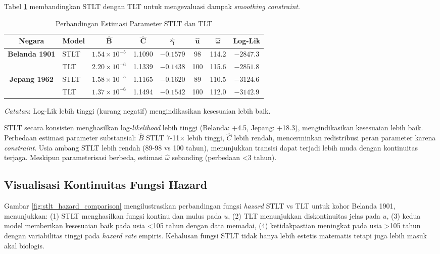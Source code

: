 Tabel \ref{tab:stlt_vs_tlt_comparison} membandingkan STLT dengan TLT untuk mengevaluasi dampak \textit{smoothing constraint}.

\begin{table}[H]
\centering
\caption{Perbandingan Estimasi Parameter STLT dan TLT}
\label{tab:stlt_vs_tlt_comparison}
\small
\begin{tabular}{clcccccc}
\hline
\textbf{Negara} & \textbf{Model} & $\boldsymbol{\hat{B}}$ & $\boldsymbol{\hat{C}}$ & $\boldsymbol{\hat{\gamma}}$ & $\boldsymbol{\hat{u}}$ & $\boldsymbol{\hat{\omega}}$ & \textbf{Log-Lik} \\
\hline
\multirow{2}{*}{\textbf{Belanda 1901}}
& STLT & $1.54 \times 10^{-5}$ & 1.1090 & $-0.1579$ & 98 & 114.2 & $-2847.3$ \\
& TLT & $2.20 \times 10^{-6}$ & 1.1339 & $-0.1438$ & 100 & 115.6 & $-2851.8$ \\
\hline
\multirow{2}{*}{\textbf{Jepang 1962}}
& STLT & $1.58 \times 10^{-5}$ & 1.1165 & $-0.1620$ & 89 & 110.5 & $-3124.6$ \\
& TLT & $1.37 \times 10^{-6}$ & 1.1494 & $-0.1542$ & 100 & 112.0 & $-3142.9$ \\
\hline
\end{tabular}
\begin{tablenotes}
\small
\item \textit{Catatan}: Log-Lik lebih tinggi (kurang negatif) mengindikasikan kesesuaian lebih baik.
\end{tablenotes}
\end{table}

STLT secara konsisten menghasilkan log-\textit{likelihood} lebih tinggi (Belanda: +4.5, Jepang: +18.3), mengindikasikan kesesuaian lebih baik. Perbedaan estimasi parameter substansial: $\hat{B}$ STLT 7-11× lebih tinggi, $\hat{C}$ lebih rendah, mencerminkan redistribusi peran parameter karena \textit{constraint}. Usia ambang STLT lebih rendah (89-98 vs 100 tahun), menunjukkan transisi dapat terjadi lebih muda dengan kontinuitas terjaga. Meskipun parameterisasi berbeda, estimasi $\hat{\omega}$ sebanding (perbedaan <3 tahun).

\subsection{Visualisasi Kontinuitas Fungsi Hazard}

Gambar \ref{fig:stlt_hazard_comparison} mengilustrasikan perbandingan fungsi \textit{hazard} STLT vs TLT untuk kohor Belanda 1901, menunjukkan: (1) STLT menghasilkan fungsi kontinu dan mulus pada $u$, (2) TLT menunjukkan diskontinuitas jelas pada $u$, (3) kedua model memberikan kesesuaian baik pada usia <105 tahun dengan data memadai, (4) ketidakpastian meningkat pada usia >105 tahun dengan variabilitas tinggi pada \textit{hazard rate} empiris. Kehalusan fungsi STLT tidak hanya lebih estetis matematis tetapi juga lebih masuk akal biologis.

